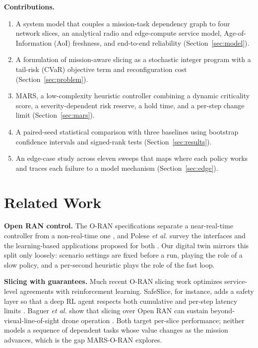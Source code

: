 \documentclass[conference]{IEEEtran}
\begin{document}
\textbf{Contributions.}
\begin{enumerate}
\item A system model that couples a mission-task dependency graph to four network slices, an analytical radio and edge-compute service model, Age-of-Information (AoI) freshness, and end-to-end reliability (Section~\ref{sec:model}).
\item A formulation of mission-aware slicing as a stochastic integer program with a tail-risk (CVaR) objective term and reconfiguration cost (Section~\ref{sec:problem}).
\item MARS, a low-complexity heuristic controller combining a dynamic criticality score, a severity-dependent risk reserve, a hold time, and a per-step change limit (Section~\ref{sec:mars}).
\item A paired-seed statistical comparison with three baselines using bootstrap confidence intervals and signed-rank tests (Section~\ref{sec:results}).
\item An edge-case study across eleven sweeps that maps where each policy works and traces each failure to a model mechanism (Section~\ref{sec:edge}).
\end{enumerate}

\section{Related Work}
\textbf{Open RAN control.} The O-RAN specifications separate a near-real-time controller from a non-real-time one \cite{oranarch,oranwg3}, and Polese \emph{et al.} survey the interfaces and the learning-based applications proposed for both \cite{polese}. Our digital twin mirrors this split only loosely: scenario settings are fixed before a run, playing the role of a slow policy, and a per-second heuristic plays the role of the fast loop.

\textbf{Slicing with guarantees.} Much recent O-RAN slicing work optimizes service-level agreements with reinforcement learning. SafeSlice, for instance, adds a safety layer so that a deep RL agent respects both cumulative and per-step latency limits \cite{safeslice}. Baguer \emph{et al.} show that slicing over Open RAN can sustain beyond-visual-line-of-sight drone operation \cite{bvlos}. Both target per-slice performance; neither models a sequence of dependent tasks whose value changes as the mission advances, which is the gap MARS-O-RAN explores.
\end{document}
